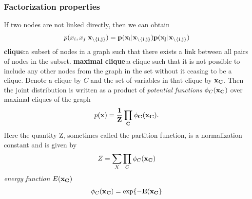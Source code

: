 \documentclass[a4paper]{book}
\begin{document}
\subsubsection{Factorization properties}
If two nodes are not linked directly, then we can obtain
\begin{equation}\label{eq8.10}
  p(x_i,x_j|\bf{x}_{\backslash\{i,j\}}) = p(x_i|\bf x_{\backslash\{i,j\}})p(x_j|\bf x_{\backslash\{i,j\}})
\end{equation}
\textbf{clique}:a subset of nodes in a graph such that there exists a link between all pairs of nodes in the subset. \newline
\textbf{maximal clique}:a clique such that it is not possible to include any
other nodes from the graph in the set without it ceasing to be a clique.\newline
Denote a clique by $C$ and the set of variables in that clique by $\bf x_C$. Then the joint distribution is written as a product of \emph{potential functions}
$\phi_C(\bf x_C)$ over maximal cliques of the graph
\begin{equation}\label{eq8.11}
  p(\bf x) = \frac{1}{Z}\prod_{C}\phi_C(\bf x_C).
\end{equation}
Here the quantity Z, sometimes called the partition function, is a normalization constant
and is given by
\begin{equation}\label{eq8.12}
  Z=\sum_{X}\prod_{C}\phi_C(\bf x_C)
\end{equation}
\emph{energy function} $E(\bf x_C)$
\begin{equation}\label{eq8.13}
  \phi_C(\bf x_C) = \exp\{-E(\bf x_C\}
\end{equation}
\end{document}
